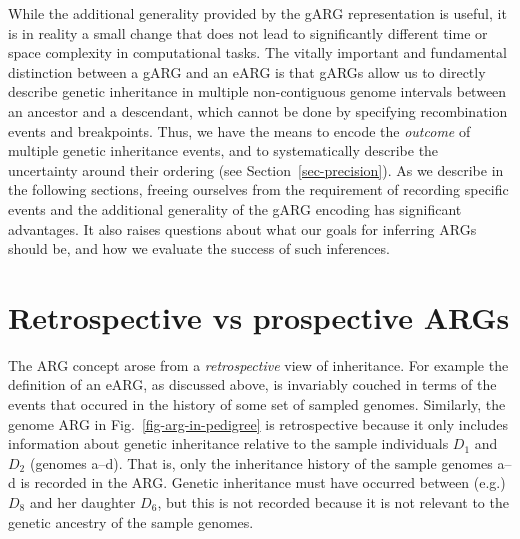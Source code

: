 \documentclass{article}
\newcommand{\noderef}[1]{\textsf{#1}}
\begin{document}
While the additional generality provided by the gARG representation
is useful, it is in reality a small change that does not
lead to significantly different time or space complexity in computational
tasks.
The vitally important and fundamental distinction between
a gARG and an eARG is that gARGs
allow us to directly describe
genetic inheritance in multiple non-contiguous genome intervals
between an ancestor and a descendant, which cannot be done
by specifying recombination events and breakpoints.
Thus, we have the means to encode the \emph{outcome} of
multiple genetic inheritance events, and to
systematically describe the uncertainty around their
ordering (see Section~\ref{sec-precision}).
As we describe in the following sections, freeing ourselves from the requirement
of recording specific events and
the additional generality of the gARG encoding
has significant advantages. It also raises questions about what our goals
for inferring ARGs should be, and how we evaluate the success
of such inferences.

\section{Retrospective vs prospective ARGs}
\label{sec-retro-pro}
The ARG concept arose from a \emph{retrospective} view of inheritance.
For example the definition of an eARG, as discussed above, is invariably
couched in terms of the events that occured in the history of some set of sampled
genomes. Similarly, the genome ARG in Fig.~\ref{fig-arg-in-pedigree}
is retrospective because it only includes information
about genetic inheritance relative to the sample individuals
$D_1$ and $D_2$ (genomes \noderef{a}--\noderef{d}).
That is, only the inheritance
history of the sample genomes \noderef{a}--\noderef{d} is recorded in the ARG.
Genetic inheritance must have occurred between (e.g.)
$D_8$ and her daughter $D_6$, but this is not recorded because
it is not relevant to the genetic ancestry of the sample genomes.
\end{document}
